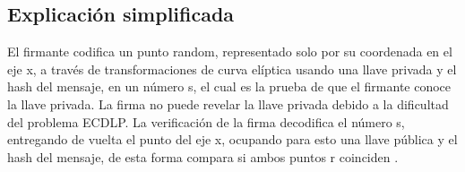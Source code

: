 \bigskip
\subsection{Explicación simplificada}

\noindent El firmante codifica un punto random, representado solo por su coordenada en el eje x, a través de transformaciones de curva elíptica usando una llave privada y el hash del mensaje, en un número s, el cual es la prueba de que el firmante conoce la llave privada. La firma no puede revelar la llave privada debido a la dificultad del problema ECDLP. La verificación de la firma decodifica el número s, entregando de vuelta el punto del eje x, ocupando para esto una llave pública y el hash del mensaje, de esta forma compara si ambos puntos r coinciden \cite{ECDA}.

